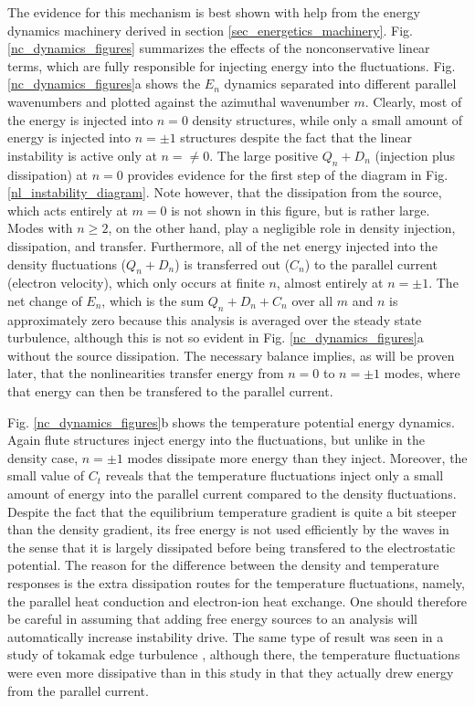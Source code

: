 \documentclass[twocolumn,showpacs,preprintnumbers,amsmath,amssymb]{revtex4}
\begin{document}
The evidence for this mechanism is best shown with
help from the energy dynamics machinery derived in section \ref{sec_energetics_machinery}. Fig. \ref{nc_dynamics_figures} summarizes the effects of the nonconservative linear terms, which are
fully responsible for injecting energy into the fluctuations. Fig. \ref{nc_dynamics_figures}a shows the $E_n$ dynamics separated into different parallel wavenumbers and plotted
against the azimuthal wavenumber $m$. Clearly, most of the energy is injected into $n=0$ density structures, while only a small amount of energy is injected into
$n= \pm 1$ structures despite the fact that the linear instability is active only at $n= \ne 0$. The large positive $Q_n + D_n$ (injection plus dissipation) at $n=0$ provides evidence for the first
step of the diagram in Fig. \ref{nl_instability_diagram}. Note however, that the dissipation from the source, which acts entirely at $m=0$ is not shown in this figure, but is rather large.
Modes with $n \ge 2$, on the other hand, play a negligible role in density injection, dissipation, and transfer. 
Furthermore, all of the net energy injected into the density fluctuations ($Q_n + D_n$) is transferred out ($C_n$) to
the parallel current (electron velocity), which only occurs at finite $n$, almost entirely at $n = \pm 1$. The net change of $E_n$, which is the sum $Q_n + D_n + C_n$ over all $m$ and $n$
is approximately zero because this analysis is averaged over the steady state turbulence, although this is not so evident in Fig. \ref{nc_dynamics_figures}a without the source dissipation. 
The necessary balance implies, as will be proven later, that the nonlinearities transfer energy from $n=0$ to $n = \pm 1$ modes, where that energy can then
be transfered to the parallel current.

Fig. \ref{nc_dynamics_figures}b shows the temperature potential energy dynamics. Again flute structures inject energy into the fluctuations, but unlike in the density case, $n = \pm 1$ modes
dissipate more energy than they inject. Moreover, the small value of $C_t$ reveals that the temperature fluctuations inject only a small amount of energy into the parallel current compared
to the density fluctuations. Despite the fact that the equilibrium temperature gradient is quite a bit steeper than the density gradient, its free energy is not used efficiently by the waves
in the sense that it is largely dissipated before being transfered to the electrostatic potential. The reason for the difference
between the density and temperature responses is the extra dissipation routes for the temperature fluctuations, namely, the parallel heat conduction and electron-ion heat exchange.
One should therefore be careful in assuming that adding free energy sources to an analysis will automatically increase instability drive.
The same type of result was seen in a study of tokamak edge turbulence \cite{zeiler1997}, although there, the temperature fluctuations were even more dissipative than in this study in that they
actually drew energy from the parallel current. 
\end{document}
